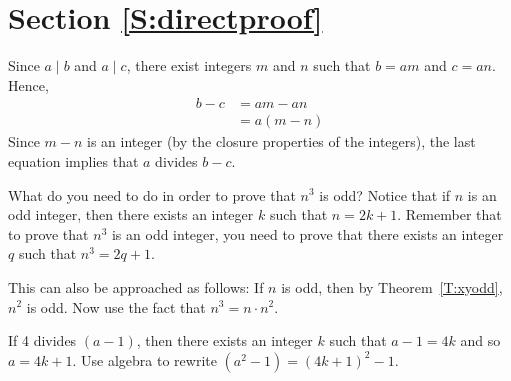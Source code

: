 \section*{Section \ref{S:directproof}}
\renewcommand{\labelenumi}{(\textbf{\alph{enumi}})}

\begin{list}{\bf{\ref{exer:sec31-prove}.}}
\item  \begin{list}{\bf{(a)}}
\item Since $a \mid b$ and $a \mid c$, there exist integers $m$ and $n$ such that $b = am$ and $c = an$.  Hence,
\begin{align*}
b - c &= am - an \\
      &= a(m - n)
\end{align*}
Since $m - n$ is an integer (by the closure properties of the integers), the last equation implies that $a$ divides $b - c$.

\end{list}
\end{list}

\begin{list}{}
\item  \begin{list}{\bf{(b)}}
\item What do you need to do in order to prove that $n^3$ is odd?  Notice that if $n$ is an odd integer, then there exists an integer $k$ such that $n = 2k + 1$.  Remember that to prove that $n^3$ is an odd integer, you need to prove that there exists an integer $q$ such that $n^3 = 2q + 1$.

This can also be approached as follows:  If $n$ is odd, then  by Theorem~\ref{T:xyodd}, $n^2$ is odd.  Now use the fact that $n^3 = n \cdot n^2$.
\end{list}
\end{list}


\begin{list}{}
\item  \begin{list}{\bf{(c)}}
\item If 4 divides $(a - 1)$, then there exists an integer $k$ such that $a - 1 = 4k$ and so  
$a = 4k + 1$.  Use algebra to rewrite $\left( a^2 - 1 \right) = (4k + 1)^2 - 1$.
\end{list}
\end{list}


